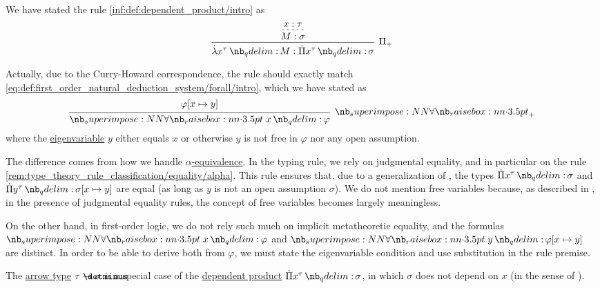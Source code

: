 \begin{remark}\label{rem:typing_rule_eigenvariables}
  We have stated the rule \ref{inf:def:dependent_product/intro} as
  \begin{equation*}
    \begin{prooftree}
      \hypo{ x: \tau }
      \infer[dashed]1{ M: \sigma }
      \infer1[\ensuremath{ \Pi_+ }]{ \qabs {x^\tau} M: \qprod {x^\tau} \sigma }
    \end{prooftree}
  \end{equation*}

  Actually, due to the Curry-Howard correspondence, the rule should exactly match \ref{eq:def:first_order_natural_deduction_system/forall/intro}, which we have stated as
  \begin{equation*}
    \begin{prooftree}
      \hypo{ \varphi[x \mapsto y] }
      \infer1[\ensuremath{ \synforall_+ }]{ \qforall x \varphi },
    \end{prooftree}
  \end{equation*}
  where the \hyperref[con:eigenvariable]{eigenvariable} \( y \) either equals \( x \) or otherwise \( y \) is not free in \( \varphi \) nor any open assumption.

  The difference comes from how we handle \hyperref[def:lambda_term_alpha_equivalence]{\( \alpha \)-equivalence}. In the typing rule, we rely on judgmental equality, and in particular on the rule \ref{rem:type_theory_rule_classification/equality/alpha}. This rule ensures that, due to a generalization of , the types \( \qprod {x^\tau} \sigma \) and \( \qprod {y^\tau} \sigma[x \mapsto y] \) are equal (as long as \( y \) is not an open assumption \( \sigma \)). We do not mention free variables because, as described in , in the presence of judgmental equality rules, the concept of free variables becomes largely meaningless.

  On the other hand, in first-order logic, we do not rely such much on implicit metatheoretic equality, and the formulas \( \qforall x \varphi \) and \( \qforall y \varphi[x \mapsto y] \) are distinct. In order to be able to derive both from \( \varphi \), we must state the eigenvariable condition and use substitution in the rule premise.
\end{remark}

\begin{remark}\label{rem:arrow_type_via_dependent_product}
  The \hyperref[def:arrow_type]{arrow type} \( \tau \synimplies \sigma \) is a special case of the \hyperref[def:dependent_product]{dependent product} \( \qprod {x^\tau} \sigma \), in which \( \sigma \) does not depend on \( x \) (in the sense of ).
\end{remark}

